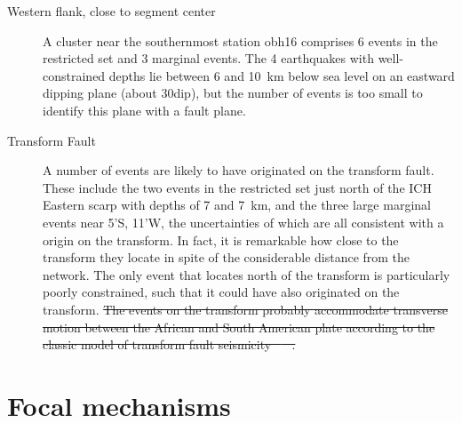 \documentclass[jgr]{agu2001}
\newlength{\tw}
\providecommand{\DIFdel}[1]{{\protect\color{red}\sout{#1}}}                      %
\providecommand{\DIFdelbegin}{} %
\providecommand{\DIFdelend}{} %
\begin{document}
\begin{article}
\begin{description}
\item[Western flank, close to segment center]
A cluster near the southernmost station obh16
comprises 6 events in the restricted set and 3 marginal events.
The 4 earthquakes with well-constrained depths lie between  6 and
10~km below sea level on an eastward
dipping plane (about 30\dg dip), but the number of events is too small to identify this
plane with a fault plane.

\item[Transform Fault]  A number of events are likely to have
originated on the transform fault.  These include the two events in the
restricted set just north of the ICH Eastern scarp with depths of
7 and 7~km, and the three
large marginal events near 5'S, 11'W, the uncertainties of
which are all consistent with a origin on the transform. In fact, it
is remarkable how close to the transform they locate in spite of  the
considerable distance from the network.  The only event that locates  north of the transform is
particularly poorly constrained, such that it could have also
originated on the transform.  
\DIFdelbegin \DIFdel{The events on the transform probably
accommodate transverse motion between the African and South American
plate according to the classic model of transform fault seismicity \mbox{%
\citep{sykes67}
}%
.
}\DIFdelend %
\end{description}

\section{Focal mechanisms}


\end{article}
\end{document}
